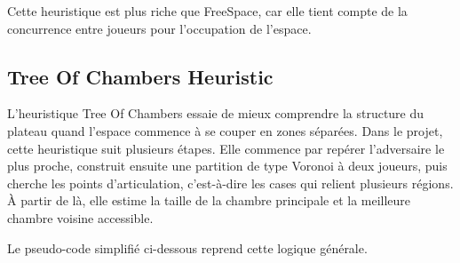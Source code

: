 \documentclass[11pt,a4paper]{article}
\begin{document}
Cette heuristique est plus riche que FreeSpace, car elle tient compte de la concurrence entre joueurs pour l'occupation de l'espace.

\subsection{Tree Of Chambers Heuristic}

L'heuristique Tree Of Chambers essaie de mieux comprendre la structure du plateau quand l'espace commence à se couper en zones séparées. Dans le projet, cette heuristique suit plusieurs étapes. Elle commence par repérer l'adversaire le plus proche, construit ensuite une partition de type Voronoi à deux joueurs, puis cherche les points d'articulation, c'est-à-dire les cases qui relient plusieurs régions. À partir de là, elle estime la taille de la chambre principale et la meilleure chambre voisine accessible.

Le pseudo-code simplifié ci-dessous reprend cette logique générale.

\begin{algorithm}[H]
\DontPrintSemicolon
{}


\BlankLine

\caption{Heuristique Tree of Chambers (ToC)}
\end{algorithm}
\end{document}
